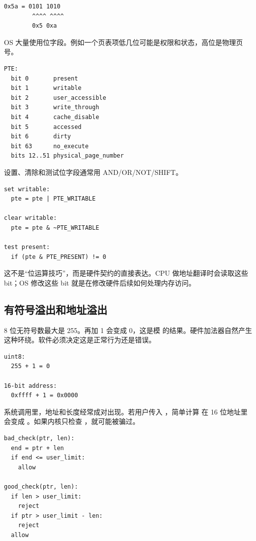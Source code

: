 \begin{lstlisting}
0x5a = 0101 1010
        ^^^^ ^^^^
        0x5 0xa
\end{lstlisting}

OS 大量使用位字段。例如一个页表项低几位可能是权限和状态，高位是物理页号。

\begin{lstlisting}
PTE:
  bit 0       present
  bit 1       writable
  bit 2       user_accessible
  bit 3       write_through
  bit 4       cache_disable
  bit 5       accessed
  bit 6       dirty
  bit 63      no_execute
  bits 12..51 physical_page_number
\end{lstlisting}

设置、清除和测试位字段通常用 AND/OR/NOT/SHIFT。

\begin{lstlisting}
set writable:
  pte = pte | PTE_WRITABLE

clear writable:
  pte = pte & ~PTE_WRITABLE

test present:
  if (pte & PTE_PRESENT) != 0
\end{lstlisting}

这不是“位运算技巧”，而是硬件契约的直接表达。CPU 做地址翻译时会读取这些 bit；OS 修改这些 bit 就是在修改硬件后续如何处理内存访问。

\subsection{有符号溢出和地址溢出}

8 位无符号数最大是 255。再加 1 会变成 0，这是模  的结果。硬件加法器自然产生这种环绕。软件必须决定这是正常行为还是错误。

\begin{lstlisting}
uint8:
  255 + 1 = 0

16-bit address:
  0xffff + 1 = 0x0000
\end{lstlisting}

系统调用里，地址和长度经常成对出现。若用户传入 ，简单计算  在 16 位地址里会变成 。如果内核只检查 ，就可能被骗过。

\begin{lstlisting}
bad_check(ptr, len):
  end = ptr + len
  if end <= user_limit:
    allow

good_check(ptr, len):
  if len > user_limit:
    reject
  if ptr > user_limit - len:
    reject
  allow
\end{lstlisting}


